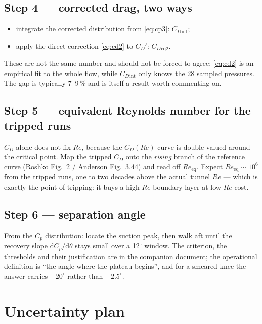 \documentclass[11pt,a4paper]{article}
\newcommand{\Cp}{\ensuremath{C_p}}
\newcommand{\CD}{\ensuremath{C_D}}
\newcommand{\ReD}{\ensuremath{\mathit{Re}}}
\begin{document}
\subsection{Step 4 --- corrected drag, two ways}

\begin{itemize}[leftmargin=1.2em,itemsep=1pt,topsep=2pt]
\item integrate the corrected distribution from \eqref{eq:cp3}: $\CD{}_{\text{int}}$;
\item apply the direct correction \eqref{eq:cd2} to $\CD'$: $\CD{}_{\text{eq2}}$.
\end{itemize}
These are not the same number and should not be forced to agree: \eqref{eq:cd2} is an
empirical fit to the whole flow, while $\CD{}_{\text{int}}$ only knows the 28 sampled pressures.
The gap is typically 7--9\,\% and is itself a result worth commenting on.

\subsection{Step 5 --- equivalent Reynolds number for the tripped runs}

$\CD$ alone does not fix $\ReD$, because the $\CD(\ReD)$ curve is double-valued around the
critical point. Map the tripped $\CD$ onto the \emph{rising} branch of the reference curve
(Roshko Fig.~2 / Anderson Fig.~3.44) and read off $\ReD_{\text{eq}}$. Expect
$\ReD_{\text{eq}} \sim 10^6$ from the tripped runs, one to two decades above the actual
tunnel $\ReD$ --- which is exactly the point of tripping: it buys a high-\ReD{} boundary layer
at low-\ReD{} cost.

\subsection{Step 6 --- separation angle}

From the \Cp{} distribution: locate the suction peak, then walk aft until the recovery slope
$\mathrm{d}\Cp/\mathrm{d}\theta$ stays small over a 12$^\circ$ window. The criterion, the
thresholds and their justification are in the companion document; the operational definition
is ``the angle where the plateau begins'', and for a smeared knee the answer carries
$\pm 20^\circ$ rather than $\pm 2.5^\circ$.

\section{Uncertainty plan}
\end{document}
